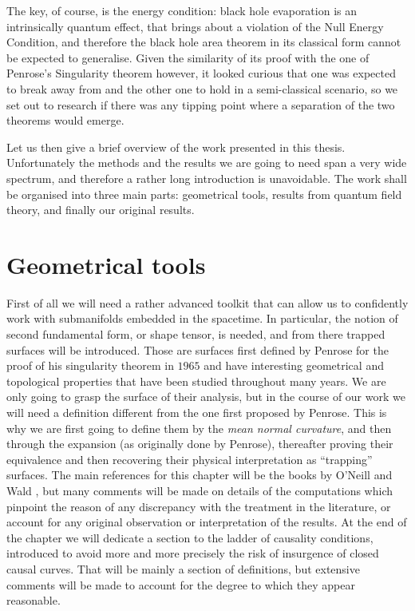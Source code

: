 The key, of course, is the energy condition: black hole evaporation is an intrinsically quantum effect, that brings about a violation of the Null Energy Condition, and therefore the black hole area theorem in its classical form cannot be expected to generalise. Given the similarity of its proof with the one of Penrose's Singularity theorem however, it looked curious that one was expected to break away from and the other one to hold in a semi-classical scenario, so we set out to research if there was any tipping point where a separation of the two theorems would emerge.

Let us then give a brief overview of the work presented in this thesis. Unfortunately the methods and the results we are going to need span a very wide spectrum, and therefore a rather long introduction is unavoidable. The work shall be organised into three main parts: geometrical tools, results from quantum field theory, and finally our original results.

\section{Geometrical tools}
First of all we will need a rather advanced toolkit that can allow us to confidently work with submanifolds embedded in the spacetime. In particular, the notion of second fundamental form, or shape tensor, is needed, and from there trapped surfaces will be introduced. Those are surfaces first defined by Penrose for the proof of his singularity theorem in \(1965\) and have interesting geometrical and topological properties that have been studied throughout many years. We are only going to grasp the surface of their analysis, but in the course of our work we will need a definition different from the one first proposed by Penrose. This is why we are first going to define them by the \emph{mean normal curvature}, and then through the expansion (as originally done by Penrose), thereafter proving their equivalence and then recovering their physical interpretation as ``trapping'' surfaces.
The main references for this chapter will be the books by O'Neill \cite[]{o1983semi} and Wald \cite[]{wald2010general}, but many comments will be made on details of the computations which pinpoint the reason of any discrepancy with the treatment in the literature, or account for any original observation or interpretation of the results.
At the end of the chapter we will dedicate a section to the ladder of causality conditions, introduced to avoid more and more precisely the risk of insurgence of closed causal curves. That will be mainly a section of definitions, but extensive comments will be made to account for the degree to which they appear reasonable.  

